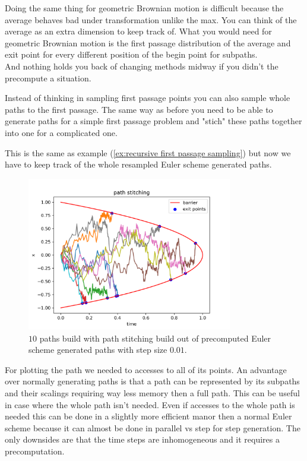 \documentclass[a4paper,12pt]{article}
\begin{document}
Doing the same thing for geometric Brownian motion is difficult because the average
behaves bad under transformation unlike the max. You can think of the average
as an extra dimension to keep track of. What you would need  for geometric
Brownian motion is the  first passage distribution of the average and exit
point for every different position of the begin point for subpaths.\\
And nothing holds you back of changing methods midway if you didn't
the precompute a situation.

\begin{technique}
    Instead of thinking in sampling first passage points you can also sample
    whole paths to the first passage. The same way as before you need to be
    able to generate paths for a simple first passage problem and "stich"
    these paths together into one for a complicated one.
\end{technique}

\begin{example}
    This is the same as example (\ref{ex:recursive first passage sampling}) but now we have
    to keep track of the whole resampled Euler scheme generated paths.

    \begin{figure}[ht!]
        \centering
        \includegraphics[width=0.8\textwidth]{plots/path stitching para.png}
        \caption{ $10$ paths build with path stitching build out of
            precomputed Euler scheme generated paths with step size $0.01$.}
        \label{fig:path stitching para}
    \end{figure}
\end{example}

For plotting the path we needed to accesses to all of its points.  An advantage
over normally generating paths is that a path can be represented by its subpaths
and their scalings requiring way less memory then a full path. This can be useful
in case where the whole path isn't needed. Even if  accesses to the whole
path is needed this can be done in a slightly more efficient manor
then a normal Euler scheme because it can almost be done in parallel
vs step for step generation. The only downsides are that the time
steps are inhomogeneous and it requires a precomputation. \\
\end{document}
